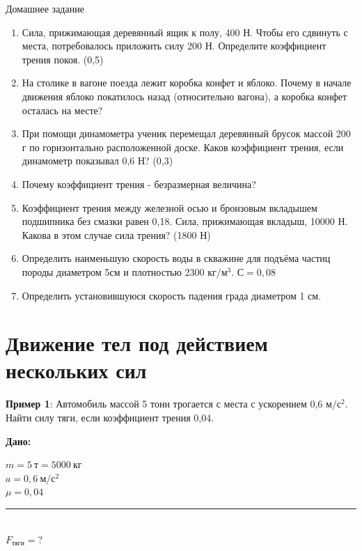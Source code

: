 \documentclass[a5paper, 10pt]{diss_4}
\renewcommand{\'}{\,'}
\begin{document}
\begin{center}
   Домашнее задание
\end{center}
\begin{enumerate}

\item Сила, прижимающая деревянный ящик к полу, 400 Н. Чтобы его сдвинуть с места, потребовалось приложить силу 200 Н. Определите коэффициент трения покоя. (0,5)

\item На столике в вагоне поезда лежит коробка конфет и яблоко. Почему в начале движения яблоко покатилось назад (относительно вагона), а коробка конфет осталась на месте?

\item При помощи динамометра ученик перемещал деревянный брусок массой 200 г по горизонтально расположенной доске. Каков коэффициент трения, если динамометр показывал 0,6 Н? (0,3)

\item Почему коэффициент трения - безразмерная величина?

\item Коэффициент трения между железной осью и бронзовым вкладышем подшипника без смазки равен 0,18. Сила, прижимающая вкладыш, 10000 Н. Какова в этом случае сила трения? (1800 Н)

\item Определить наименьшую скорость воды в скважине для подъёма частиц породы диаметром 5см и плотностью 2300 $кг/м^3$. $С=0,08$

\item Определить установившуюся скорость падения града диаметром 1 см.
\end{enumerate}


\section{Движение тел под действием нескольких сил}

\textbf{Пример 1}: Автомобиль массой 5 тонн трогается с места с ускорением 0,6 $м/с^2.$
Найти силу тяги, если коэффициент трения 0,04.

\hspace{1cm}\textbf{Дано:}\hspace{.3cm}
\parbox[t]{4cm}{
$m = 5\ т=5000\ кг$\\
$a = 0,6\ м/с^2$\\
$\mu = 0,04$\\
\rule{4cm}{.4pt}\\
$F_{тяги} = ?$\\
}
\end{document}
